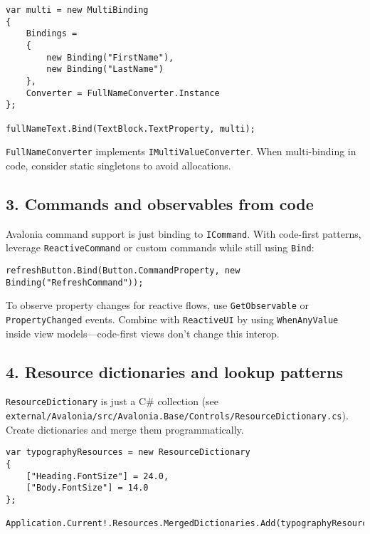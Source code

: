 \begin{lstlisting}
var multi = new MultiBinding
{
    Bindings =
    {
        new Binding("FirstName"),
        new Binding("LastName")
    },
    Converter = FullNameConverter.Instance
};

fullNameText.Bind(TextBlock.TextProperty, multi);
\end{lstlisting}

\passthrough{\lstinline!FullNameConverter!} implements
\passthrough{\lstinline!IMultiValueConverter!}. When multi-binding in
code, consider static singletons to avoid allocations.

\subsection{3. Commands and observables from
code}\label{commands-and-observables-from-code}

Avalonia command support is just binding to
\passthrough{\lstinline!ICommand!}. With code-first patterns, leverage
\passthrough{\lstinline!ReactiveCommand!} or custom commands while still
using \passthrough{\lstinline!Bind!}:

\begin{lstlisting}
refreshButton.Bind(Button.CommandProperty, new Binding("RefreshCommand"));
\end{lstlisting}

To observe property changes for reactive flows, use
\passthrough{\lstinline!GetObservable!} or
\passthrough{\lstinline!PropertyChanged!} events. Combine with
\passthrough{\lstinline!ReactiveUI!} by using
\passthrough{\lstinline!WhenAnyValue!} inside view models---code-first
views don't change this interop.

\subsection{4. Resource dictionaries and lookup
patterns}\label{resource-dictionaries-and-lookup-patterns}

\passthrough{\lstinline!ResourceDictionary!} is just a C\# collection
(see
\passthrough{\lstinline!external/Avalonia/src/Avalonia.Base/Controls/ResourceDictionary.cs!}).
Create dictionaries and merge them programmatically.

\begin{lstlisting}
var typographyResources = new ResourceDictionary
{
    ["Heading.FontSize"] = 24.0,
    ["Body.FontSize"] = 14.0
};

Application.Current!.Resources.MergedDictionaries.Add(typographyResources);
\end{lstlisting}

